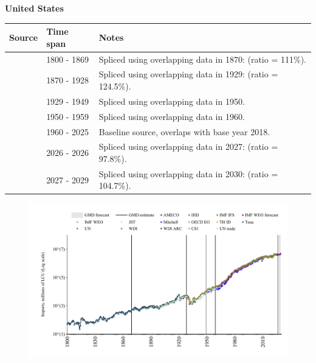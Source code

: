 \documentclass[12pt,a4paper,landscape]{article}
\begin{document}
\begin{adjustbox}{max totalsize={\paperwidth}{\paperheight},center}
\begin{minipage}[t][\textheight][t]{\textwidth}
\vspace*{0.5cm}
{}
\begin{center}
{\Large\bfseries United States}
\end{center}
\vspace{0.5cm}
\begin{table}[H]
\centering
\small
\begin{tabular}{|l|l|l|}
\hline
\textbf{Source} & \textbf{Time span} & \textbf{Notes} \\
\hline
\rowcolor{white}\cite{Tena}& 1800 - 1869 &Spliced using overlapping data in 1870: (ratio = 111\%).\\
\rowcolor{lightgray}\cite{JST}& 1870 - 1928 &Spliced using overlapping data in 1929: (ratio = 124.5\%).\\
\rowcolor{white}\cite{CS1_USA}& 1929 - 1949 &Spliced using overlapping data in 1950.\\
\rowcolor{lightgray}\cite{IMF_IFS}& 1950 - 1959 &Spliced using overlapping data in 1960.\\
\rowcolor{white}\cite{OECD_EO}& 1960 - 2025 &Baseline source, overlaps with base year 2018.\\
\rowcolor{lightgray}\cite{AMECO}& 2026 - 2026 &Spliced using overlapping data in 2027: (ratio = 97.8\%).\\
\rowcolor{white}\cite{IMF_WEO_forecast}& 2027 - 2029 &Spliced using overlapping data in 2030: (ratio = 104.7\%).\\
\hline
\end{tabular}
\end{table}
\begin{figure}[H]
\centering
\includegraphics[width=\textwidth,height=0.6\textheight,keepaspectratio]{graphs/USA_imports.pdf}
\end{figure}
\end{minipage}
\end{adjustbox}
\end{document}
